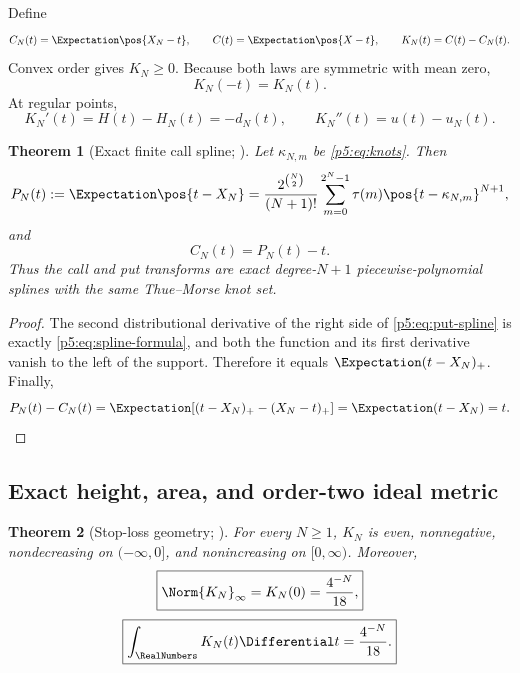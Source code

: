\documentclass[11pt,oneside]{article}
\numberwithin{equation}{section}
\newtheorem{theorem}{Theorem}[section]
\theoremstyle{definition}
\theoremstyle{remark}
\begin{document}
Define
\begin{equation}
 C_N(t)=\Expectation\pos{X_N-t},
 \qquad
 C(t)=\Expectation\pos{X-t},
 \qquad
 K_N(t)=C(t)-C_N(t).
 \label{p5:eq:call-def}
\end{equation}
Convex order gives $K_N\ge0$.  Because both laws are symmetric with mean zero,
\begin{equation}
 K_N(-t)=K_N(t).
 \label{p5:eq:K-even}
\end{equation}
At regular points,
\begin{equation}
 K_N'(t)=H(t)-H_N(t)=-d_N(t),
 \qquad
 K_N''(t)=u(t)-u_N(t).
 \label{p5:eq:K-derivatives}
\end{equation}

\begin{theorem}[Exact finite call spline; \newresult]
Let $\kappa_{N,m}$ be \eqref{p5:eq:knots}.  Then
\begin{equation}
 P_N(t):=\Expectation\pos{t-X_N}
 =\frac{2^{\binom N2}}{(N+1)!}
 \sum_{m=0}^{2^N-1}\tau(m)\pos{t-\kappa_{N,m}}^{N+1},
 \label{p5:eq:put-spline}
\end{equation}
and
\begin{equation}
 C_N(t)=P_N(t)-t.
 \label{p5:eq:call-spline}
\end{equation}
Thus the call and put transforms are exact degree-$N+1$ piecewise-polynomial splines with the same Thue--Morse knot set.
\end{theorem}

\begin{proof}
The second distributional derivative of the right side of \eqref{p5:eq:put-spline} is exactly \eqref{p5:eq:spline-formula}, and both the function and its first derivative vanish to the left of the support.  Therefore it equals $\Expectation(t-X_N)_+$.  Finally,
\[
 P_N(t)-C_N(t)=\Expectation[(t-X_N)_+-(X_N-t)_+]=\Expectation(t-X_N)=t.
\]
\end{proof}

\subsection{Exact height, area, and order-two ideal metric}

\begin{theorem}[Stop-loss geometry; \newresult]
For every $N\ge1$, $K_N$ is even, nonnegative, nondecreasing on $(-\infty,0]$, and nonincreasing on $[0,\infty)$.  Moreover,
\begin{equation}
 \boxed{
 \Norm{K_N}_\infty=K_N(0)=\frac{4^{-N}}{18},}
 \label{p5:eq:K-height}
\end{equation}
\begin{equation}
 \boxed{
 \int_{\RealNumbers}K_N(t)\Differential t=\frac{4^{-N}}{18}.}
 \label{p5:eq:K-area}
\end{equation}
\end{theorem}
\end{document}
